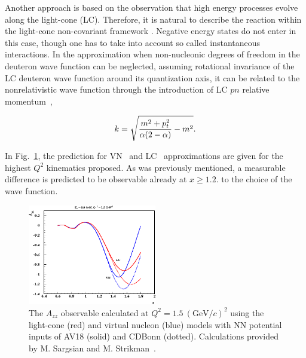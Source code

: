 Another approach is based on the observation that high energy processes
evolve along the light-cone (LC).  Therefore, it is natural to describe the 
reaction within the light-cone non-covariant framework \cite{Frankfurt:1981mk}. 
Negative energy states do not enter in this case, though one has to take into 
account so called instantaneous interactions.
In the approximation when non-nucleonic degrees of freedom in the
deuteron wave function can be neglected, assuming rotational invariance of the LC deuteron wave function around its quantization axis, it can be related to the nonrelativistic wave function through the introduction of LC $pn$ relative momentum~\cite{Frankfurt:1981mk, Miller:2009fc},

\begin{equation}
k=\sqrt{{m^2+p_t^2\over \alpha(2-\alpha)} - m^2}.
\end{equation}

In Fig.~\ref{fig:misak}, the prediction for VN~\cite{Sargsian:2009hf} and LC~\cite{Frankfurt:1993sp} approximations are given 
for the highest $Q^2$ kinematics proposed. As was previously mentioned, a measurable 
difference is predicted to be observable already at $x\ge 1.2$.
to the choice of the wave function.  
 
 

\begin{figure}
\begin{center}
\includegraphics[width=0.50\textwidth]{figs/mark_misak_azz.eps}
\caption{\label{fig:misak} The $A_{zz}$ observable calculated at $Q^2=1.5~(\mathrm{GeV}/c)^2$ using the light-cone (red) and virtual nucleon (blue) models with NN potential inputs of AV18 (solid) and CDBonn (dotted). Calculations provided by M. Sargsian and M. Strikman~\cite{Sargsian:2014fla}.}
\end{center}
\end{figure}

